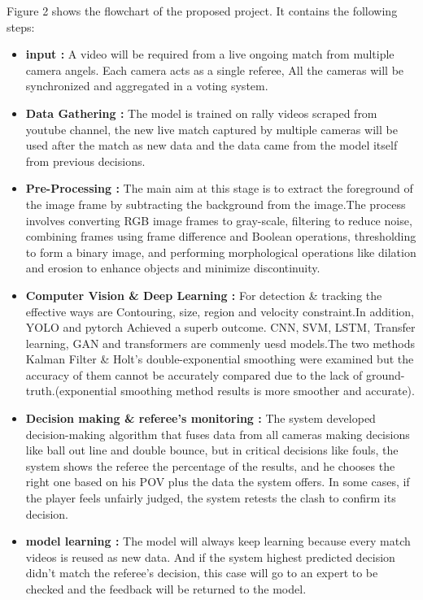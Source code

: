 \documentclass[12pt]{article}
\begin{document}
Figure 2 shows the flowchart of the proposed project. It contains the following steps:
\begin{itemize}
    \item \textbf{input :} A video will be required from a live ongoing match from multiple camera angels. Each camera acts as a single referee, All the cameras will be synchronized and aggregated in a voting system.
    \item \textbf{Data Gathering :} The model is trained on rally videos scraped from youtube channel, the new live match captured by multiple cameras will be used after the match as new data and the data came from the model itself from previous decisions.
    \item \textbf{Pre-Processing :} The main aim at this stage is to extract the foreground of the image frame by subtracting the background from the image.The process involves converting RGB image frames to gray-scale, filtering to reduce noise, combining frames using frame difference and Boolean operations, thresholding to form a binary image, and performing morphological operations like dilation and erosion to enhance objects and minimize discontinuity.
    \item \textbf{Computer Vision \& Deep Learning :} For detection \& tracking the effective ways are Contouring, size, region and velocity constraint.In addition, YOLO and pytorch Achieved a superb outcome. CNN, SVM, LSTM, Transfer learning, GAN and transformers are commenly uesd models.The two methods Kalman Filter \& Holt’s double-exponential smoothing were examined but the accuracy of them cannot be accurately compared due to the lack of ground-truth.(exponential smoothing method results is more smoother and accurate)\cite{squashLowCost}.
    \item \textbf{Decision making \& referee's monitoring :} The system developed decision-making algorithm that fuses data from all cameras making decisions like ball out line and double bounce, but in critical decisions like fouls, the system shows the referee the percentage of the results, and he chooses the right one based on his POV plus the data the system offers. In some cases, if the player feels unfairly judged, the system retests the clash to confirm its decision.
    \item \textbf{model learning :} The model will always keep learning because every match videos is reused as new data. And if the system highest predicted decision didn't match the referee's decision, this case will go to an expert to be checked and the feedback will be returned to the model.

\end{itemize}
\end{document}
